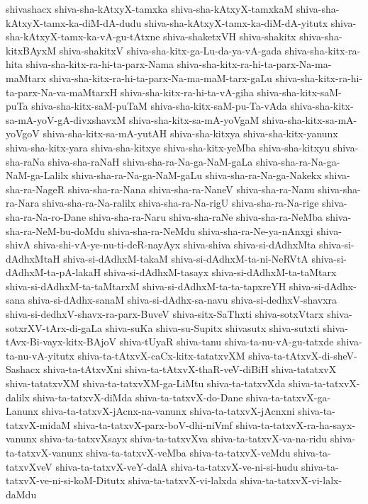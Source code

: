 {shivashacx
shiva-sha-kAtxyX-tamxka
shiva-sha-kAtxyX-tamxkaM
shiva-sha-kAtxyX-tamx-ka-diM-dA-dudu
shiva-sha-kAtxyX-tamx-ka-diM-dA-yitutx
shiva-sha-kAtxyX-tamx-ka-vA-gu-tAtxne
shiva-shaketxVH
shiva-shakitx
shiva-sha-kitxBAyxM
shiva-shakitxV
shiva-sha-kitx-ga-Lu-da-ya-vA-gada
shiva-sha-kitx-ra-hita
shiva-sha-kitx-ra-hi-ta-parx-Nama
shiva-sha-kitx-ra-hi-ta-parx-Na-ma-maMtarx
shiva-sha-kitx-ra-hi-ta-parx-Na-ma-maM-tarx-gaLu
shiva-sha-kitx-ra-hi-ta-parx-Na-va-maMtarxH
shiva-sha-kitx-ra-hi-ta-vA-giha
shiva-sha-kitx-saM-puTa
shiva-sha-kitx-saM-puTaM
shiva-sha-kitx-saM-pu-Ta-vAda
shiva-sha-kitx-sa-mA-yoV-gA-divxshavxM
shiva-sha-kitx-sa-mA-yoVgaM
shiva-sha-kitx-sa-mA-yoVgoV
shiva-sha-kitx-sa-mA-yutAH
shiva-sha-kitxya
shiva-sha-kitx-yanunx
shiva-sha-kitx-yara
shiva-sha-kitxye
shiva-sha-kitx-yeMba
shiva-sha-kitxyu
shiva-sha-raNa
shiva-sha-raNaH
shiva-sha-ra-Na-ga-NaM-gaLa
shiva-sha-ra-Na-ga-NaM-ga-Lalilx
shiva-sha-ra-Na-ga-NaM-gaLu
shiva-sha-ra-Na-ga-Nakekx
shiva-sha-ra-NageR
shiva-sha-ra-Nana
shiva-sha-ra-NaneV
shiva-sha-ra-Nanu
shiva-sha-ra-Nara
shiva-sha-ra-Na-ralilx
shiva-sha-ra-Na-rigU
shiva-sha-ra-Na-rige
shiva-sha-ra-Na-ro-Dane
shiva-sha-ra-Naru
shiva-sha-raNe
shiva-sha-ra-NeMba
shiva-sha-ra-NeM-bu-doMdu
shiva-sha-ra-NeMdu
shiva-sha-ra-Ne-ya-nAnxgi
shiva-shivA
shiva-shi-vA-ye-nu-ti-deR-nayAyx
shiva-shiva
shiva-si-dAdhxMta
shiva-si-dAdhxMtaH
shiva-si-dAdhxM-takaM
shiva-si-dAdhxM-ta-ni-NeRVtA
shiva-si-dAdhxM-ta-pA-lakaH
shiva-si-dAdhxM-tasayx
shiva-si-dAdhxM-ta-taMtarx
shiva-si-dAdhxM-ta-taMtarxM
shiva-si-dAdhxM-ta-ta-tapxreYH
shiva-si-dAdhx-sana
shiva-si-dAdhx-sanaM
shiva-si-dAdhx-sa-navu
shiva-si-dedhxV-shavxra
shiva-si-dedhxV-shavx-ra-parx-BuveV
shiva-sitx-SaThxti
shiva-sotxVtarx
shiva-sotxrXV-tArx-di-gaLa
shiva-suKa
shiva-su-Supitx
shivasutx
shiva-sutxti
shiva-tAvx-Bi-vayx-kitx-BAjoV
shiva-tUyaR
shiva-tanu
shiva-ta-nu-vA-gu-tatxde
shiva-ta-nu-vA-yitutx
shiva-ta-tAtxvX-caCx-kitx-tatatxvXM
shiva-ta-tAtxvX-di-sheV-Sashacx
shiva-ta-tAtxvXni
shiva-ta-tAtxvX-thaR-veV-diBiH
shiva-tatatxvX
shiva-tatatxvXM
shiva-ta-tatxvXM-ga-LiMtu
shiva-ta-tatxvXda
shiva-ta-tatxvX-dalilx
shiva-ta-tatxvX-diMda
shiva-ta-tatxvX-do-Dane
shiva-ta-tatxvX-ga-Lanunx
shiva-ta-tatxvX-jAcnx-na-vanunx
shiva-ta-tatxvX-jAcnxni
shiva-ta-tatxvX-midaM
shiva-ta-tatxvX-parx-boV-dhi-niVmf
shiva-ta-tatxvX-ra-ha-sayx-vanunx
shiva-ta-tatxvXsayx
shiva-ta-tatxvXva
shiva-ta-tatxvX-va-na-ridu
shiva-ta-tatxvX-vanunx
shiva-ta-tatxvX-veMba
shiva-ta-tatxvX-veMdu
shiva-ta-tatxvXveV
shiva-ta-tatxvX-veY-dalA
shiva-ta-tatxvX-ve-ni-si-hudu
shiva-ta-tatxvX-ve-ni-si-koM-Ditutx
shiva-ta-tatxvX-vi-lalxda
shiva-ta-tatxvX-vi-lalx-daMdu
}
